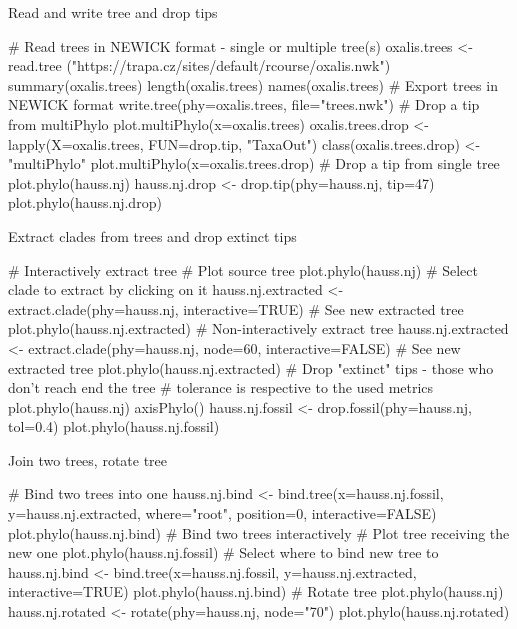 \documentclass[compress, ucs, xelatex, 11pt, xcolor=svgnames,
  hyperref={
    bookmarks=true,
    unicode=true,
    colorlinks=true,
    pdftitle={Molecular data in R},
    plainpages=false,
    pdfauthor={Vojtech Zeisek},
    pdfsubject={Course about phylogeny and evolution in R},
    pdfcreator={XeLaTeX},
    pdfkeywords={R, evolution, phylogeny, molecular data},
    linkcolor=Tomato,
    anchorcolor=SaddleBrown,
    citecolor=Goldenrod,
    filecolor=DarkMagenta,
    menucolor=Sienna,
    urlcolor=DarkTurquoise,
    pdftex},
  url={hyphens, lowtilde} %
  ]{beamer}
\begin{document}
\begin{frame}[fragile]{Read and write tree and drop tips}
  \begin{spluscode}
    # Read trees in NEWICK format - single or multiple tree(s)
    oxalis.trees <- read.tree
      ("https://trapa.cz/sites/default/rcourse/oxalis.nwk")
    summary(oxalis.trees)
    length(oxalis.trees)
    names(oxalis.trees)
    # Export trees in NEWICK format
    write.tree(phy=oxalis.trees, file="trees.nwk")
    # Drop a tip from multiPhylo
    plot.multiPhylo(x=oxalis.trees)
    oxalis.trees.drop <- lapply(X=oxalis.trees, FUN=drop.tip, "TaxaOut")
    class(oxalis.trees.drop) <- "multiPhylo"
    plot.multiPhylo(x=oxalis.trees.drop)
    # Drop a tip from single tree
    plot.phylo(hauss.nj)
    hauss.nj.drop <- drop.tip(phy=hauss.nj, tip=47)
    plot.phylo(hauss.nj.drop)
  \end{spluscode}
\end{frame}

\begin{frame}[fragile]{Extract clades from trees and drop extinct tips}
  \begin{spluscode}
    # Interactively extract tree
    # Plot source tree
    plot.phylo(hauss.nj)
    # Select clade to extract by clicking on it
    hauss.nj.extracted <- extract.clade(phy=hauss.nj, interactive=TRUE)
    # See new extracted tree
    plot.phylo(hauss.nj.extracted)
    # Non-interactively extract tree
    hauss.nj.extracted <- extract.clade(phy=hauss.nj, node=60,
      interactive=FALSE)
    # See new extracted tree
    plot.phylo(hauss.nj.extracted)
    # Drop "extinct" tips - those who don't reach end the tree
    # tolerance is respective to the used metrics
    plot.phylo(hauss.nj)
    axisPhylo()
    hauss.nj.fossil <- drop.fossil(phy=hauss.nj, tol=0.4)
    plot.phylo(hauss.nj.fossil)
  \end{spluscode}
\end{frame}

\begin{frame}[fragile]{Join two trees, rotate tree}
  \begin{spluscode}
    # Bind two trees into one
    hauss.nj.bind <- bind.tree(x=hauss.nj.fossil, y=hauss.nj.extracted,
      where="root", position=0, interactive=FALSE)
    plot.phylo(hauss.nj.bind)
    # Bind two trees interactively
    # Plot tree receiving the new one
    plot.phylo(hauss.nj.fossil)
    # Select where to bind new tree to
    hauss.nj.bind <- bind.tree(x=hauss.nj.fossil, y=hauss.nj.extracted,
      interactive=TRUE)
    plot.phylo(hauss.nj.bind)
    # Rotate tree
    plot.phylo(hauss.nj)
    hauss.nj.rotated <- rotate(phy=hauss.nj, node="70")
    plot.phylo(hauss.nj.rotated)
  \end{spluscode}
\end{frame}
\end{document}
